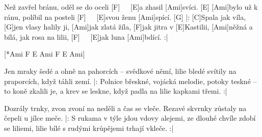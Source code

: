 
\sloka
[Ami]Než zavřel bránu, oděl se do oceli [F]\ \ \ [E]a zhasil [Ami]svíci. [E]
[Ami]bylo už k ránu, políbil na posteli [F]\ \ \ [E]svou ženu [Ami]spící. [G]
|: [C]Spala jak víla, [G]jen vlasy halily ji,
[Ami]jak zlatá žíla, [F]jak jitra v [E]Kastilii,
[Ami]něžná a bílá, jak rosa na lilii,
[F]\ \ \ [E]jak luna [Ami]bdící. :|

[*Ami F E Ami F E Ami]

\sloka
Jen mraky šedé a ohně na pahorcích – svědkové němí,
lilie bledé svítily na praporcích, když táhli zemí.
|: Polnice břeskné, vojácká melodie,
potoky teskné – to koně zkalili je,
a krev se leskne, když padla na lilie kapkami třemi. :|


\sloka
Dozrály trnky, zvon zvoní na neděli a čas se vleče.
Rezavé skvrnky zůstaly na čepeli u jílce meče.
|: S rukama v týle jdou vdovy alejemi,
ze dlouhé chvíle zdobí se liliemi,
lilie bílé s rudými krůpějemi trhají vkleče. :|

